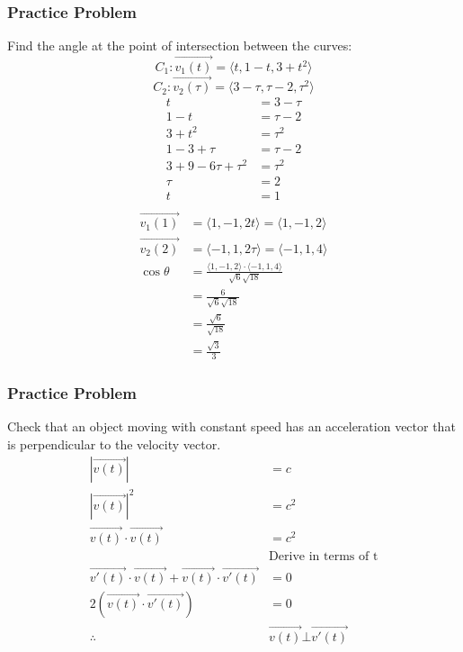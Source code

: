 \documentclass{math}
\begin{document}
\subsubsection*{Practice Problem}
Find the angle at the point of intersection between the curves:
\[ C_1: \overrightarrow{v_1(t)} = \langle t,1-t,3+t^2\rangle \]
\[ C_2: \overrightarrow{v_2(\tau)} = \langle3-\tau,\tau-2,\tau^2\rangle \]
\begin{align*}
  t &= 3-\tau \\
  1-t &= \tau-2 \\
  3+t^2 &= \tau^2 \\
  1-3+\tau &= \tau-2 \\
  3+9-6\tau+\tau^2 &= \tau^2 \\
  \tau &= 2 \\
  t &= 1 \\
\end{align*}
\begin{align*}
  \overrightarrow{v_1(1)} &= \langle1,-1,2t\rangle = \langle1,-1,2\rangle \\
  \overrightarrow{v_2(2)} &= \langle-1,1,2\tau\rangle = \langle-1,1,4\rangle \\
  \cos\theta &= \frac{\langle1,-1,2\rangle\cdot\langle-1,1,4\rangle}
    {\sqrt{6}\sqrt{18}} \\
  &= \frac{6}{\sqrt{6}\sqrt{18}} \\
  &= \frac{\sqrt{6}}{\sqrt{18}} \\
  &= \frac{\sqrt{3}}{3}
\end{align*}

\subsubsection*{Practice Problem}
Check that an object moving with constant speed has an acceleration vector that
is perpendicular to the velocity vector.
\begin{align*}
  |\overrightarrow{v(t)}| &= c \\
  |\overrightarrow{v(t)}|^2 &= c^2 \\
  \overrightarrow{v(t)}\cdot\overrightarrow{v(t)} &= c^2 \\
  &\text{Derive in terms of t} \\
  \overrightarrow{v'(t)}\cdot\overrightarrow{v(t)}+
    \overrightarrow{v(t)}\cdot\overrightarrow{v'(t)} &= 0 \\
  2\left(\overrightarrow{v(t)}\cdot\overrightarrow{v'(t)}\right) &= 0 \\
  \therefore~& \overrightarrow{v(t)}\bot\overrightarrow{v'(t)}
\end{align*}
\end{document}
